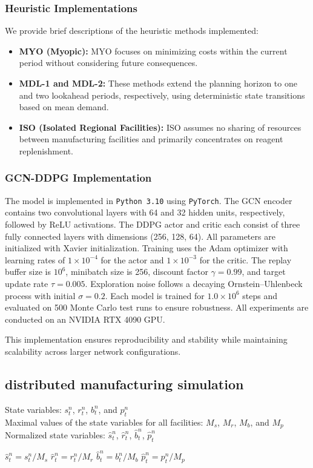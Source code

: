 \documentclass[preprint,review,12pt,nonatbib]{elsarticle}
\begin{document}
\subsubsection{Heuristic Implementations}
We provide brief descriptions of the heuristic methods implemented:
\begin{itemize}
    \item \textbf{MYO (Myopic):} MYO focuses on minimizing costs within the current period without considering future consequences.
    \item \textbf{MDL-1 and MDL-2:} These methods extend the planning horizon to one and two lookahead periods, respectively, using deterministic state transitions based on mean demand.
    \item \textbf{ISO (Isolated Regional Facilities):} ISO assumes no sharing of resources between manufacturing facilities and primarily concentrates on reagent replenishment.
\end{itemize}

\subsubsection{GCN-DDPG Implementation}
The model is implemented in \texttt{Python 3.10} using \texttt{PyTorch}. 
The GCN encoder contains two convolutional layers with 64 and 32 hidden units, respectively, 
followed by ReLU activations. 
The DDPG actor and critic each consist of three fully connected layers with dimensions (256, 128, 64).
All parameters are initialized with Xavier initialization. 
Training uses the Adam optimizer with learning rates of $1\times10^{-4}$ for the actor and 
$1\times10^{-3}$ for the critic. 
The replay buffer size is $10^6$, minibatch size is 256, discount factor $\gamma=0.99$, 
and target update rate $\tau=0.005$. 
Exploration noise follows a decaying Ornstein–Uhlenbeck process with initial $\sigma=0.2$. 
Each model is trained for $1.0\times10^6$ steps and evaluated on 500 Monte Carlo test runs to 
ensure robustness. All experiments are conducted on an NVIDIA RTX 4090 GPU. 

This implementation ensures reproducibility and stability while maintaining scalability across
larger network configurations.
\subsection{distributed manufacturing simulation}
\begin{algorithm}
\caption{State normalization}
\begin{algorithmic}[1]
\Require State variables: $s_t^n$, $r_t^n$, $b_t^n$, and $p_t^n$ \\
         Maximal values of the state variables for all facilities: $M_s$, $M_r$, $M_b$, and $M_p$
\Ensure Normalized state variables: $\hat{s}_t^n$, $\hat{r}_t^n$, $\hat{b}_t^n$, $\hat{p}_t^n$

    \State $\hat{s}_t^n = s_t^n / M_s$
    \State $\hat{r}_t^n = r_t^n / M_r$
    \State $\hat{b}_t^n = b_t^n / M_b$
    \State $\hat{p}_t^n = p_t^n / M_p$
\EndFor
\end{algorithmic}
\end{algorithm}
\end{document}
